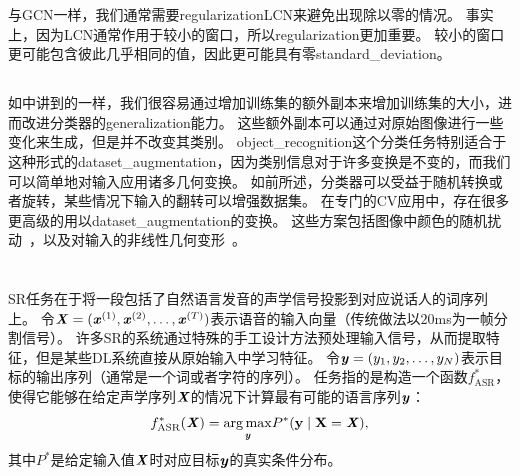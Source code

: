 与\gls{GCN}一样，我们通常需要\gls{regularization}\gls{LCN}来避免出现除以零的情况。
事实上，因为\gls{LCN}通常作用于较小的窗口，所以\gls{regularization}更加重要。
较小的窗口更可能包含彼此几乎相同的值，因此更可能具有零\gls{standard_deviation}。


\subsection{}
\label{sec:dataset_augmentation_chap12}
如中讲到的一样，我们很容易通过增加训练集的额外副本来增加训练集的大小，进而改进分类器的\gls{generalization}能力。
这些额外副本可以通过对原始图像进行一些变化来生成，但是并不改变其类别。
\gls{object_recognition}这个分类任务特别适合于这种形式的\gls{dataset_augmentation}，因为类别信息对于许多变换是不变的，而我们可以简单地对输入应用诸多几何变换。
如前所述，分类器可以受益于随机转换或者旋转，某些情况下输入的翻转可以增强数据集。
在专门的\gls{CV}应用中，存在很多更高级的用以\gls{dataset_augmentation}的变换。
这些方案包括图像中颜色的随机扰动~\citep{Krizhevsky-2012}，以及对输入的非线性几何变形~\citep{chapter-gradient-document-2001}。




\section{}
\label{sec:speech_recognition}

\gls{SR}任务在于将一段包括了自然语言发音的声学信号投影到对应说话人的词序列上。
令$\boldsymbol{\mathit{X}}=(\boldsymbol{\mathit{x}}^{(1)},\boldsymbol{\mathit{x}}^{(2)},\ldots,\boldsymbol{\mathit{x}}^{(T)})$表示语音的输入向量（传统做法以$20$ms为一帧分割信号）。
许多\gls{SR}的系统通过特殊的手工设计方法预处理输入信号，从而提取特征，但是某些\gls{DL}系统\citep{jaitly2011learning}直接从原始输入中学习特征。
令$\boldsymbol{\mathit{y}}=(y_{1},y_{2},\ldots,y_{N})$表示目标的输出序列（通常是一个词或者字符的序列）。
任务指的是构造一个函数$f^*_{\text{ASR}}$，使得它能够在给定声学序列$\boldsymbol{\mathit{X}}$的情况下计算最有可能的语言序列$\boldsymbol{\mathit{y}}$：
\begin{align}
\label{eqn:124}
f^*_{\text{ASR}}(\boldsymbol{\mathit{X}}) =  \underset{\boldsymbol{\mathit{y}}}{\arg\max}  P^*(\mathbf{y} \mid \boldsymbol{\mathrm{X}} = \boldsymbol{\mathit{X}}),
\end{align}
其中$P^*$是给定输入值$\boldsymbol{\mathit{X}}$时对应目标$\boldsymbol{\mathit{y}}$的真实条件分布。


